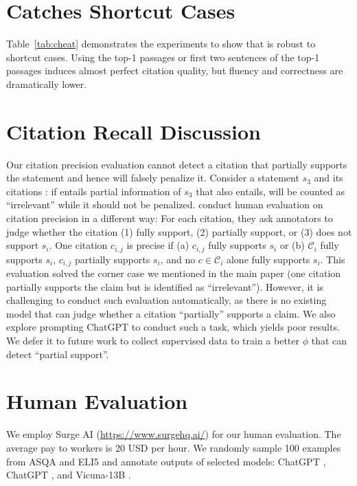 \section{\citeeval{} Catches Shortcut Cases}
\label{app_sec:short_cut}



Table~\ref{tab:cheat} demonstrates the experiments to show that \citeeval{}
is robust to shortcut cases.
Using the top-1 passages or first two sentences of the top-1 passages
induces almost perfect citation quality, 
but fluency and correctness  are dramatically lower.

\section{Citation Recall Discussion}
\label{app_sec:citation_recall}

Our citation precision evaluation cannot detect a citation that partially supports the statement and hence will falsely penalize it. 
Consider a statement $s_3$ and its citations \ttt{[2][4][5]}:
if \ttt{[2]} entails partial information of $s_3$ that \ttt{[4][5]} also entails, 
\ttt{[2]} will be counted as ``irrelevant'' while it should not be penalized.
\citet{liu2023evaluating} conduct human evaluation on citation precision in a different way:
For each citation,
they ask annotators to judge whether the citation (1) fully support, (2) partially support, or (3) does not support $s_i$. 
One citation $c_{i,j}$ is precise if
(a) $c_{i,j}$ fully supports $s_i$ or 
(b) $\mathcal{C}_i$ fully supports $s_i$, $c_{i,j}$ partially supports $s_i$, and no $c\in \mathcal{C}_i$ alone fully supports $s_i$.
This evaluation solved the corner case we mentioned in the main paper (one citation partially supports the claim but is identified as ``irrelevant'').
However, it is challenging to conduct such evaluation automatically,
as there is no existing model that can judge whether a citation ``partially'' supports a claim.
We also explore prompting ChatGPT to conduct such a task, which yields poor results.
We defer it to future work to collect  supervised data to train a better $\phi$ that can detect ``partial support''.

\section{Human Evaluation}
\label{app_sec:human}

We employ Surge AI (\url{https://www.surgehq.ai/}) for our human evaluation.
The average pay to workers is 20 USD per hour.
We randomly sample 100 examples from ASQA and ELI5 and annotate outputs of selected models: ChatGPT \vani, ChatGPT \rerank, and Vicuna-13B \vani.


